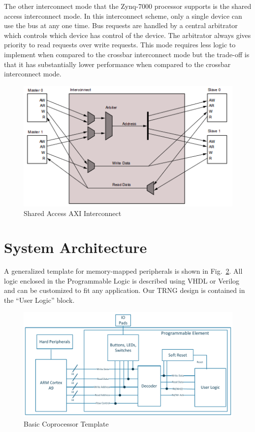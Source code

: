 \documentclass[journal]{IEEEtran}
\begin{document}
The other interconnect mode that the Zynq-7000 processor supports is the shared access interconnect mode. In this interconnect scheme, only a single device can use the bus at any one time. Bus requests are handled by a central arbitrator which controls which device has control of the device. The arbitrator always gives priority to read requests over write requests. This mode requires less logic to implement when compared to the crossbar interconnect mode but the trade-off is that it has substantially lower performance when compared to the crossbar interconnect mode.


\begin{figure}[!th]
\centering
\includegraphics[scale=.4]{Images/Shared_Access_Interconnect.png}
\caption{Shared Access AXI Interconnect \cite{AXI_Reference_Guide}}
\label{fig:Shared_Access_Interconnect}
\end{figure}





\section{System Architecture}

A generalized template for memory-mapped peripherals is shown in Fig.~\ref{fig:template}. All logic enclosed in the Programmable Logic is described using VHDL or Verilog and can be customized to fit any application. Our TRNG design is contained in the ``User Logic'' block.

\begin{figure}[!th]
\centering
\includegraphics[scale=.35]{Images/coprocessor-template.pdf}
\caption{ Basic Coprocessor Template}
\label{fig:template}
\end{figure} 
\end{document}
